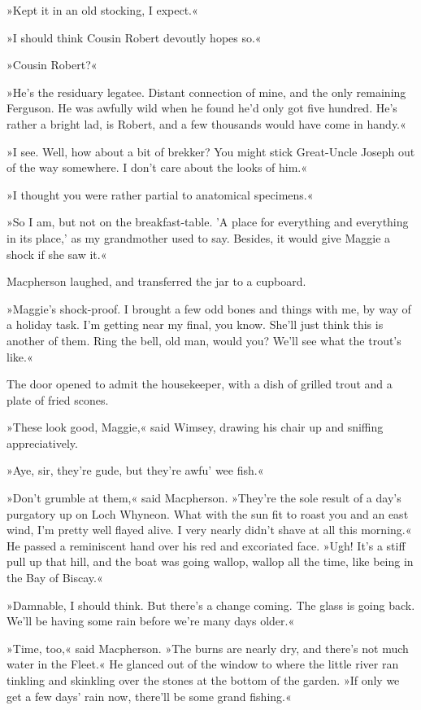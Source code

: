 »Kept it in an old stocking, I expect.«

»I should think Cousin Robert devoutly hopes so.«

»Cousin Robert?«

»He's the residuary legatee. Distant connection of mine, and the only remaining Ferguson. He was awfully wild when he found he'd only got five hundred. He's rather a bright lad, is Robert, and a few thousands would have come in handy.«

»I see. Well, how about a bit of brekker? You might stick Great-Uncle Joseph out of the way somewhere. I don't care about the looks of him.«

»I thought you were rather partial to anatomical specimens.«

»So I am, but not on the breakfast-table. 'A place for everything and everything in its place,' as my grandmother used to say. Besides, it would give Maggie a shock if she saw it.«

Macpherson laughed, and transferred the jar to a cupboard.

»Maggie's shock-proof. I brought a few odd bones and things with me, by way of a holiday task. I'm getting near my final, you know. She'll just think this is another of them. Ring the bell, old man, would you? We'll see what the trout's like.«

The door opened to admit the housekeeper, with a dish of grilled trout and a plate of fried scones.

»These look good, Maggie,« said Wimsey, drawing his chair up and sniffing appreciatively.

»Aye, sir, they're gude, but they're awfu' wee fish.«

»Don't grumble at them,« said Macpherson. »They're the sole result of a day's purgatory up on Loch Whyneon. What with the sun fit to roast you and an east wind, I'm pretty well flayed alive. I very nearly didn't shave at all this morning.« He passed a reminiscent hand over his red and excoriated face. »Ugh! It's a stiff pull up that hill, and the boat was going wallop, wallop all the time, like being in the Bay of Biscay.«

»Damnable, I should think. But there's a change coming. The glass is going back. We'll be having some rain before we're many days older.«

»Time, too,« said Macpherson. »The burns are nearly dry, and there's not much water in the Fleet.« He glanced out of the window to where the little river ran tinkling and skinkling over the stones at the bottom of the garden. »If only we get a few days' rain now, there'll be some grand fishing.«

